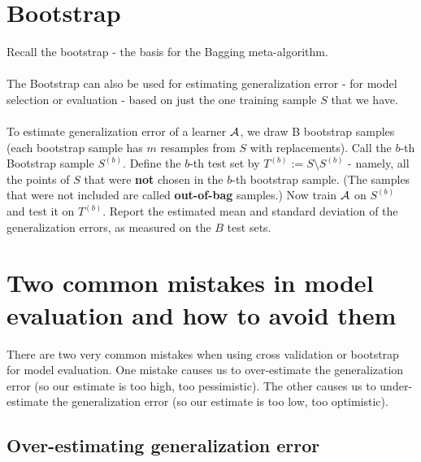 \section{Bootstrap}

Recall the bootstrap - the basis for the Bagging meta-algorithm. 
\\~\\
The Bootstrap can also be used for estimating generalization error - for model
selection or evaluation - based on just the one training sample $S$ that we
have. 
\\~\\
To estimate generalization error of a learner $\mathcal{A}$, we draw B bootstrap samples
(each bootstrap sample has $m$ resamples from $S$ with replacements). 
Call the $b$-th Bootstrap sample $S^{(b)}$. 
Define the $b$-th test set by 
$T^{(b)}:= S\setminus S^{(b)}$ - namely, all the points of $S$ that were {\bf
not} chosen in the $b$-th bootstrap sample. 
 (The samples that were not included are called {\bf
out-of-bag} samples.)
Now train $\mathcal{A}$ on $S^{(b)}$ and
test it on $T^{(b)}$.
 Report the estimated mean and standard deviation of the
generalization errors, as measured on the $B$ test sets. 

\section{Two common mistakes in model evaluation and how to avoid them}

There are two very common mistakes when using cross validation or bootstrap for
model evaluation. 
One mistake causes us to over-estimate the generalization error (so our estimate
is too high, too pessimistic). The other causes us to under-estimate the
generalization error (so our estimate is too low, too optimistic).

\subsection{Over-estimating generalization error}


